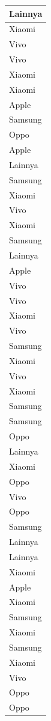 \documentclass[
  letterpaper,
  DIV=11,
  numbers=noendperiod]{scrartcl}
\begin{document}
\begin{table}
\begin{tabular}[t]{l}
\hline
Lainnya\\
\hline
Xiaomi\\
\hline
Vivo\\
\hline
Vivo\\
\hline
Xiaomi\\
\hline
Xiaomi\\
\hline
Apple\\
\hline
Samsung\\
\hline
Oppo\\
\hline
Apple\\
\hline
Lainnya\\
\hline
Samsung\\
\hline
Xiaomi\\
\hline
Vivo\\
\hline
Xiaomi\\
\hline
Samsung\\
\hline
Lainnya\\
\hline
Apple\\
\hline
Vivo\\
\hline
Vivo\\
\hline
Xiaomi\\
\hline
Vivo\\
\hline
Samsung\\
\hline
Xiaomi\\
\hline
Vivo\\
\hline
Xiaomi\\
\hline
Samsung\\
\hline
Samsung\\
\hline
Oppo\\
\hline
Lainnya\\
\hline
Xiaomi\\
\hline
Oppo\\
\hline
Vivo\\
\hline
Oppo\\
\hline
Samsung\\
\hline
Lainnya\\
\hline
Lainnya\\
\hline
Xiaomi\\
\hline
Apple\\
\hline
Xiaomi\\
\hline
Samsung\\
\hline
Xiaomi\\
\hline
Samsung\\
\hline
Xiaomi\\
\hline
Vivo\\
\hline
Oppo\\
\hline
Oppo\\

\end{tabular}
\end{table}
\end{document}
